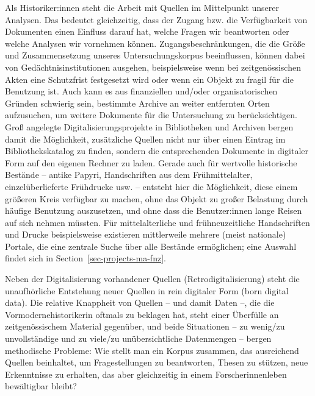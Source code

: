 \documentclass[
  letterpaper,
]{book}
\begin{document}
Als Historiker:innen steht die Arbeit mit Quellen im Mittelpunkt unserer
Analysen. Das bedeutet gleichzeitig, dass der Zugang bzw. die
Verfügbarkeit von Dokumenten einen Einfluss darauf hat, welche Fragen
wir beantworten oder welche Analysen wir vornehmen können.
Zugangsbeschränkungen, die die Größe und Zusammensetzung unseres
Untersuchungskorpus beeinflussen, können dabei von
Gedächtnisinstitutionen ausgehen, beispielsweise wenn bei
zeitgenössischen Akten eine Schutzfrist festgesetzt wird oder wenn ein
Objekt zu fragil für die Benutzung ist. Auch kann es aus finanziellen
und/oder organisatorischen Gründen schwierig sein, bestimmte Archive an
weiter entfernten Orten aufzusuchen, um weitere Dokumente für die
Untersuchung zu berücksichtigen. Groß angelegte Digitalisierungsprojekte
in Bibliotheken und Archiven bergen damit die Möglichkeit, zusätzliche
Quellen nicht nur über einen Eintrag im Bibliothekskatalog zu finden,
sondern die entsprechenden Dokumente in digitaler Form auf den eigenen
Rechner zu laden. Gerade auch für wertvolle historische Bestände --
antike Papyri, Handschriften aus dem Frühmittelalter, einzelüberlieferte
Frühdrucke usw. -- entsteht hier die Möglichkeit, diese einem größeren
Kreis verfügbar zu machen, ohne das Objekt zu großer Belastung durch
häufige Benutzung auszusetzen, und ohne dass die Benutzer:innen lange
Reisen auf sich nehmen müssten. Für mittelalterliche und
frühneuzeitliche Handschriften und Drucke beispielsweise existieren
mittlerweile mehrere (meist nationale) Portale, die eine zentrale Suche
über alle Bestände ermöglichen; eine Auswahl findet sich in
Section~\ref{sec-projects-ma-fnz}.

Neben der Digitalisierung vorhandener Quellen (Retrodigitalisierung)
steht die unaufhörliche Entstehung neuer Quellen in rein digitaler Form
(born digital data). Die relative Knappheit von Quellen -- und damit
Daten --, die die Vormodernehistorikerin oftmals zu beklagen hat, steht
einer Überfülle an zeitgenössischem Material gegenüber, und beide
Situationen -- zu wenig/zu unvollständige und zu viele/zu
unübersichtliche Datenmengen -- bergen methodische Probleme: Wie stellt
man ein Korpus zusammen, das ausreichend Quellen beinhaltet, um
Fragestellungen zu beantworten, Thesen zu stützen, neue Erkenntnisse zu
erhalten, das aber gleichzeitig in einem Forscherinnenleben bewältigbar
bleibt?
\end{document}
